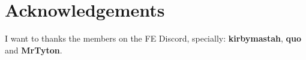 \documentclass[a4paper]{report}
\begin{document}
\newcommand{\ikef}{\item \ike:}
\newcommand{\oscarf}{\item \oscar:}
\newcommand{\titaniaf}{\item \titania:}
\newcommand{\rhysf}{\item \rhys:}
\newcommand{\gatrief}{\item \gatrie:}
\newcommand{\shinonf}{\item \shinon:}
\newcommand{\sorenf}{\item \soren:}
\newcommand{\boydf}{\item \boyd:}
\newcommand{\miaf}{\item \mia:}
\newcommand{\marciaf}{\item \marcia:}
\newcommand{\volkef}{\item \volke:}
\newcommand{\astridf}{\item \astrid:}
\newcommand{\lethef}{\item \lethe:}
\newcommand{\mordecaif}{\item \mordecai:}
\newcommand{\tanithf}{\item \tanith:}
\newcommand{\reysonf}{\item \reyson:}
\newcommand{\ulkif}{\item \ulki:}
\newcommand{\calillf}{\item \calill:}
\newcommand{\tauroneof}{\item \tauroneo:}
\newcommand{\muarimf}{\item \muarim:}
\newcommand{\largof}{\item \largo:}


\setlength{\columnsep}{.5cm}

\section*{Acknowledgements}

I want to thanks the members on the FE Discord, specially: \textbf{kirbymastah}, \textbf{quo} and \textbf{MrTyton}.



\newpage
\begin{multicols}{2}

































\end{multicols}
\end{document}
